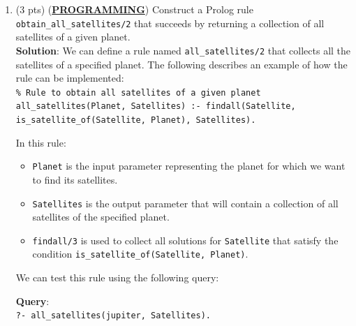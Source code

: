 \documentclass[12pt]{article}
\begin{document}
\begin{spacing}{1.5}
\begin{enumerate}
\begin{enumerate}
		      	      		      	      		      	      		      	      		      	      		      	                      
		      \end{enumerate}
		      		      		      		      		      		      
		\item
		      (3 pts) (\uline{\textbf{PROGRAMMING}}) Construct a Prolog rule \texttt{obtain\_all\_satellites/2}
		      that succeeds by returning a collection of all satellites of a given planet.\\
		      		      		      		      		      		      
		      \textbf{Solution}: We can define a rule named \texttt{all\_satellites/2} that collects all the satellites of a specified planet. The following describes an example of how the rule can be implemented:\\
		      		      		      		      		      		      
		      \texttt{\% Rule to obtain all satellites of a given planet}
		      \texttt{all\_satellites(Planet, Satellites) :- findall(Satellite, is\_satellite\_of(Satellite, Planet), Satellites).}
		      		      		      		      		      		      
		      In this rule:
		      \begin{itemize}
		      	\item \texttt{Planet} is the input parameter representing the planet for which we want to           find its satellites.
		      	      		      	      		      	      		      	      		      	      		      	      
		      	\item \texttt{Satellites} is the output parameter that will contain a collection of all satellites of the specified planet.
		      	      		      	      		      	      		      	      		      	      		      	      
		      	\item \texttt{findall/3} is used to collect all solutions for \texttt{Satellite} that satisfy the condition \texttt{is\_satellite\_of(Satellite, Planet)}.
		      \end{itemize}
		      		      		      		      		      		      
		      We can test this rule using the following query:
		      		      		      		      		      		      
		      \textbf{Query}:\\
		      \texttt{?- all\_satellites(jupiter, Satellites).}
		      		      		      		      		      		      

\end{enumerate}
\end{spacing}
\end{document}
